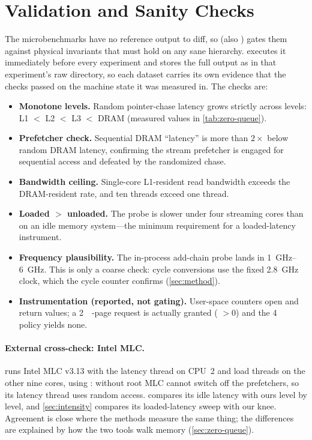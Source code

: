 \section{Validation and Sanity Checks}\label{sec:validation}

The microbenchmarks have no reference output to diff, so  (also
) gates them against physical invariants that must hold on any sane hierarchy.
 executes it immediately before every experiment and stores the full output as
 in that experiment's raw directory, so each dataset carries its own evidence that the
checks passed on the machine state it was measured in. The checks are:
\begin{itemize}
  \item \textbf{Monotone levels.} Random pointer-chase latency grows strictly across levels:
        L1 $<$ L2 $<$ L3 $<$ DRAM (measured values in \cref{tab:zero-queue}).
  \item \textbf{Prefetcher check.} Sequential DRAM ``latency'' is more than $2\times$ below random DRAM
        latency, confirming the stream prefetcher is engaged for sequential access and defeated by the
        randomized chase.
  \item \textbf{Bandwidth ceiling.} Single-core L1-resident read bandwidth exceeds the DRAM-resident rate,
        and ten threads exceed one thread.
  \item \textbf{Loaded $>$ unloaded.} The  probe is slower under four streaming cores
        than on an idle memory system---the minimum requirement for a loaded-latency instrument.
  \item \textbf{Frequency plausibility.} The in-process add-chain probe lands in
        \qtyrange{1}{6}{\giga\hertz}. This is only a coarse check: cycle conversions use the fixed
        \qty{2.8}{\giga\hertz} clock, which the cycle counter confirms (\cref{sec:method}).
  \item \textbf{Instrumentation (reported, not gating).} User-space counters open and return values;
        a \qty{2}{\mebi\byte}-page request is actually granted ( $>0$) and the
        \qty{4}{\kibi\byte} policy yields none.
\end{itemize}

\paragraph{External cross-check: Intel MLC.}  runs Intel MLC v3.13 with the latency
thread on CPU~2 and load threads on the other nine cores, using : without root MLC cannot
switch off the prefetchers, so its latency thread uses random access.  compares its
idle latency with ours level by level, and \cref{sec:intensity} compares its loaded-latency sweep with our
knee. Agreement is close where the methods measure the same thing; the differences are explained by how
the two tools walk memory (\cref{sec:zero-queue}).

